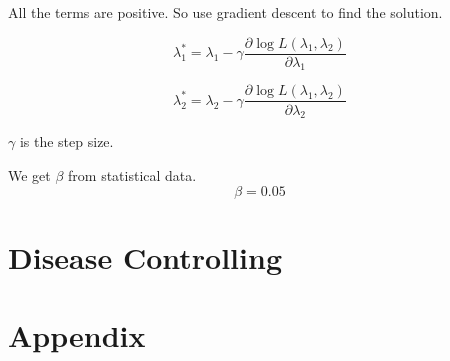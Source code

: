 \documentclass[12pt]{article}
\begin{document}
All the terms are positive. So use gradient descent to find the solution.

$$\lambda_1^* = \lambda_1 - \gamma \frac{\partial \log L(\lambda_1, \lambda_2)}{\partial \lambda_1}$$

$$\lambda_2^* = \lambda_2 - \gamma \frac{\partial \log L(\lambda_1, \lambda_2)}{\partial \lambda_2}$$

$\gamma$ is the step size.

We get $\beta$ from statistical data. $$\beta = 0.05$$ 


\section{Disease Controlling}

\section*{Appendix}





\end{document}
